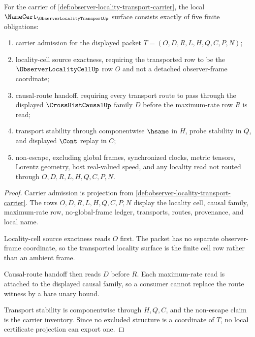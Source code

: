\begin{theorem}
\label{thm:observer-locality-transport-namecert-obligations}
For the carrier of \autoref{def:observer-locality-transport-carrier}, the local $\NameCert_{\ObserverLocalityTransportUp}$ surface consists exactly of five finite obligations:
\begin{enumerate}
\item carrier admission for the displayed packet $T=(O,D,R,L,H,Q,C,P,N)$;
\item locality-cell source exactness, requiring the transported row to be the $\ObserverLocalityCellUp$ row $O$ and not a detached observer-frame coordinate;
\item causal-route handoff, requiring every transport route to pass through the displayed $\CrossHistCausalUp$ family $D$ before the maximum-rate row $R$ is read;
\item transport stability through componentwise $\hsame$ in $H$, probe stability in $Q$, and displayed $\Cont$ replay in $C$;
\item non-escape, excluding global frames, synchronized clocks, metric tensors, Lorentz geometry, host real-valued speed, and any locality read not routed through $O,D,R,L,H,Q,C,P,N$.
\end{enumerate}
\end{theorem}
\begin{proof}
Carrier admission is projection from \autoref{def:observer-locality-transport-carrier}. The rows $O,D,R,L,H,Q,C,P,N$ display the locality cell, causal family, maximum-rate row, no-global-frame ledger, transports, routes, provenance, and local name.

Locality-cell source exactness reads $O$ first. The packet has no separate observer-frame coordinate, so the transported locality surface is the finite cell row rather than an ambient frame.

Causal-route handoff then reads $D$ before $R$. Each maximum-rate read is attached to the displayed causal family, so a consumer cannot replace the route witness by a bare unary bound.

Transport stability is componentwise through $H,Q,C$, and the non-escape claim is the carrier inventory. Since no excluded structure is a coordinate of $T$, no local certificate projection can export one.
\end{proof}

